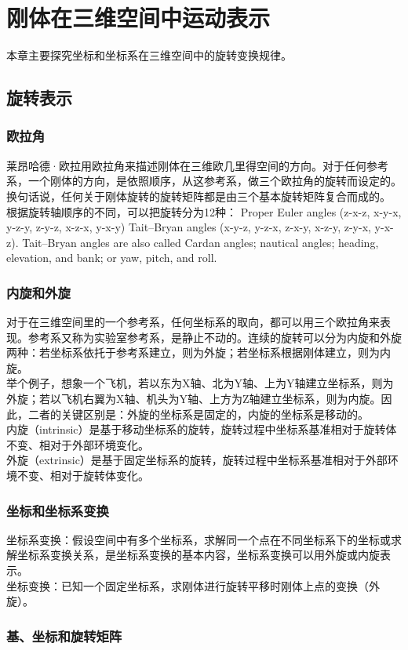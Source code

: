 \section{刚体在三维空间中运动表示}
本章主要探究坐标和坐标系在三维空间中的旋转变换规律。
\subsection{旋转表示}
\subsubsection{欧拉角}
莱昂哈德·欧拉用欧拉角来描述刚体在三维欧几里得空间的方向。对于任何参考系，一个刚体的方向，是依照顺序，从这参考系，做三个欧拉角的旋转而设定的。换句话说，任何关于刚体旋转的旋转矩阵都是由三个基本旋转矩阵复合而成的。
\\\indent
根据旋转轴顺序的不同，可以把旋转分为12种：
Proper Euler angles (z-x-z, x-y-x, y-z-y, z-y-z, x-z-x, y-x-y)
Tait–Bryan angles (x-y-z, y-z-x, z-x-y, x-z-y, z-y-x, y-x-z).
Tait–Bryan angles are also called Cardan angles; nautical angles; heading, elevation, and bank; or yaw, pitch, and roll.
\subsubsection{内旋和外旋}
对于在三维空间里的一个参考系，任何坐标系的取向，都可以用三个欧拉角来表现。参考系又称为实验室参考系，是静止不动的。连续的旋转可以分为内旋和外旋两种：若坐标系依托于参考系建立，则为外旋；若坐标系根据刚体建立，则为内旋。
\\\indent
举个例子，想象一个飞机，若以东为X轴、北为Y轴、上为Y轴建立坐标系，则为外旋；若以飞机右翼为X轴、机头为Y轴、上方为Z轴建立坐标系，则为内旋。因此，二者的关键区别是：外旋的坐标系是固定的，内旋的坐标系是移动的。
\\\indent
内旋（intrinsic）是基于移动坐标系的旋转，旋转过程中坐标系基准相对于旋转体不变、相对于外部环境变化。
\\\indent
外旋（extrinsic）是基于固定坐标系的旋转，旋转过程中坐标系基准相对于外部环境不变、相对于旋转体变化。
\subsubsection{坐标和坐标系变换}
坐标系变换：假设空间中有多个坐标系，求解同一个点在不同坐标系下的坐标或求解坐标系变换关系，是坐标系变换的基本内容，坐标系变换可以用外旋或内旋表示。
\\\indent
坐标变换：已知一个固定坐标系，求刚体进行旋转平移时刚体上点的变换（外旋）。
\subsubsection{基、坐标和旋转矩阵}

